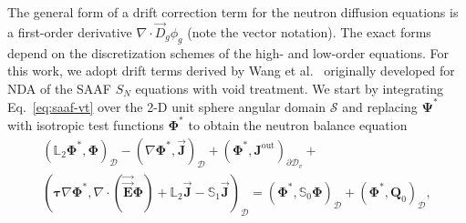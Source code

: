 The general form of a drift correction term for the neutron diffusion equations is a
first-order derivative $\nabla\cdot \vec{D}_g\phi_g$ (note the vector notation).
The exact forms depend on the discretization schemes of the high- and low-order
equations. For this work, we adopt drift terms derived by Wang et al.\
\cite{wangDiffusionAccelerationSchemes2014, wang_rattlesnake_2018} originally developed for \gls{NDA} of the
\gls{SAAF} $S_N$ equations with void treatment. We start by integrating Eq.\ \ref{eq:saaf-vt}
over the 2-D unit sphere angular domain $\mathcal{S}$ and replacing $\bm{\Psi}^*$ with isotropic
test functions $\bm{\Phi}^*$ to obtain the neutron balance equation
%
\begin{multline}
  \left(\mathbb{L}_2\bm{\Phi}^*,\bm{\Phi}\right)_\mathcal{D}
  - \left(\nabla\bm{\Phi}^*,\vec{\bm{J}}\right)_\mathcal{D}
  + \left(\bm{\Phi}^*,\bm{J}^\text{out}\right)_{\partial\mathcal{D}_v} + \\
  \left(\bm{\tau}\nabla\bm{\Phi}^*,
    \nabla\cdot(\vec{\vec{\bm{E}}}\bm{\Phi}) +\mathbb{L}_2\vec{\bm{J}} -
    \mathbb{S}_1\vec{\bm{J}}\right)_\mathcal{D}
  = \left(\bm{\Phi}^*,\mathbb{S}_0\bm{\Phi}\right)_\mathcal{D}
  + \left(\bm{\Phi}^*,\bm{Q}_0\right)_\mathcal{D},
\end{multline}
%
